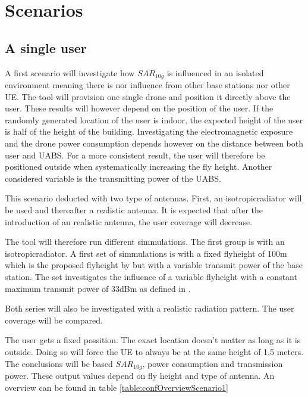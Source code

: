 \chapter{Scenarios}
\label{chap:scenarios}

\section{A single user}

A first scenario will investigate how $SAR_{10g}$ is influenced in an isolated environment meaning there is nor influence 
from other base stations nor other \gls{UE}. The tool will provision one single drone and position it directly above the user.
These results will however depend on the position of the user. If the randomly generated location of the user is indoor, the expected height
of the user is half of the height of the building. Investigating the electromagnetic exposure and the drone power consumption depends however on the
distance between both user and \gls{UABS}. For a more consistent result, the user will therefore be positioned outside when systematically 
increasing the fly height. Another considered variable is the transmitting power of the \gls{UABS}.

This scenario deducted with two type of antennas. First, an \gls{isotropicradiator} will be used and thereafter a realistic antenna.
It is expected that after the introduction of an realistic antenna, the user coverage will decrease.

The tool will therefore run different simmulations. The first group is with an \gls{isotropicradiator}. A first set of simmulations
is with a fixed flyheight of 100m which is the proposed flyheight by \cite{J2} but with a variable transmit power of the base station.
The set investigates the influence of a variable flyheight with a constant maximum transmit power of 33dBm as defined in \cite{J2}.

Both series will also be investigated with a realistic radiation pattern. The user coverage will be compared. 

The user gets a fixed possition. The exact location doesn't matter as long as it is outside. Doing so will force the \gls{UE} 
to always be at the same height of 1.5 meters. The conclusions will be based $SAR_{10g}$, power consumption and transmission power.
These output values depend on fly height and type of antenna. An overview can be found in table \ref{table:confOverviewScenario1}

